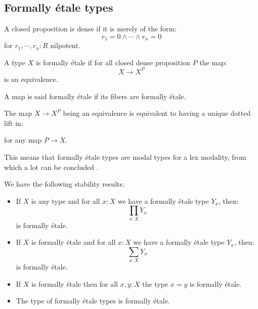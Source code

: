 \subsection{Formally étale types}

\begin{definition}
A closed proposition is dense if it is merely of the form:
\[r_1=0\land\cdots\land r_n=0\]
for $r_1,\cdots,r_n:R$ nilpotent.
\end{definition}

\begin{definition}
A type $X$ is formally étale if for all closed dense proposition $P$ the map:
\[X\to X^P\]
is an equivalence.
\end{definition}

\begin{definition}
A map is said formally étale if its fibers are formally étale.
\end{definition}

\begin{remark}
The map $X\to X^P$ being an equivalence is equivalent to having a unique dotted lift in:
\begin{center}
\end{center}
for any map $P\to X$.
\end{remark}

This means that formally étale types are modal types for a lex modality, from which a lot can be concluded \cite{TODO modalities in HoTT}.

\begin{proposition}
We have the following stability results:
\begin{itemize}
\item If $X$ is any type and for all $x:X$ we have a formally étale type $Y_x$, then:
\[\prod_{x:X}Y_x\]
is formally étale. 
\item  If $X$ is formally étale and for all $x:X$ we have a formally étale type $Y_x$, then:
\[\sum_{x:X}Y_x\]
is formally étale. 
\item If $X$ is formally étale then for all $x,y : X$ the type $x=y$ is formally étale.
\item The type of formally étale types is formally étale.
\end{itemize}
\end{proposition}

